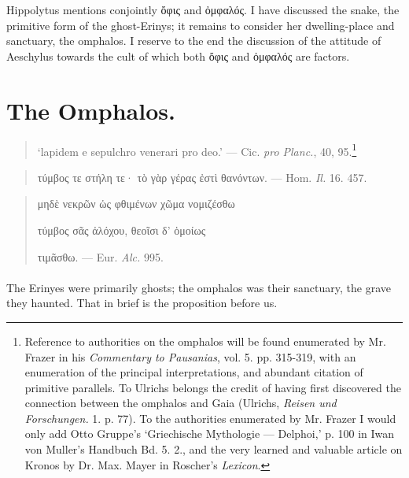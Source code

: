 \documentclass[a4paper, 11pt, oneside, polutonikogreek, english]{article}
\begin{document}
Hippolytus mentions conjointly ὄφις and ὀμφαλός. I have discussed the snake, the primitive form of the ghost-Erinys; it remains to consider her dwelling-place and sanctuary, the omphalos. I reserve to the end the discussion of the attitude of Aeschylus towards the cult of which both ὄφις and ὀμφαλός are factors.
\clearpage
\section{The Omphalos.}
\begin{quotation}
`lapidem e sepulchro venerari pro deo.' --- Cic. \emph{pro Planc.}, 40, 95.\footnote{Reference to authorities on the omphalos will be found enumerated by Mr. Frazer in his \emph{Commentary to Pausanias}, vol. 5. pp. 315-319, with an enumeration of the principal interpretations, and abundant citation of primitive parallels. To Ulrichs belongs the credit of having first discovered the connection between the omphalos and Gaia (Ulrichs, \emph{Reisen und Forschungen.} 1. p. 77). To the authorities enumerated by Mr. Frazer I would only add Otto Gruppe's `Griechische Mythologie --- Delphoi,' p. 100 in Iwan von Muller's Handbuch Bd. 5. 2., and the very learned and valuable article on Kronos by Dr. Max. Mayer in Roscher's \emph{Lexicon}.}
\end{quotation}
\begin{quotation}
τύμβος τε στήλη τε· τὸ γὰρ γέρας ἐστὶ θανόντων. --- Hom. \emph{Il.} 16. 457.
\end{quotation}
\begin{quotation}
μηδὲ νεκρῶν ὡς φθιμένων χῶμα νομιζέσθω

τύμβος σᾶς ἀλόχου, θεοῖσι δ' ὁμοίως

\hspace*{5mm}τιμᾶσθω. --- Eur. \emph{Alc.} 995. 
\end{quotation}
\paragraph{}
The Erinyes were primarily ghosts; the omphalos was their sanctuary, the grave they haunted. That in brief is the proposition before us.
\end{document}
